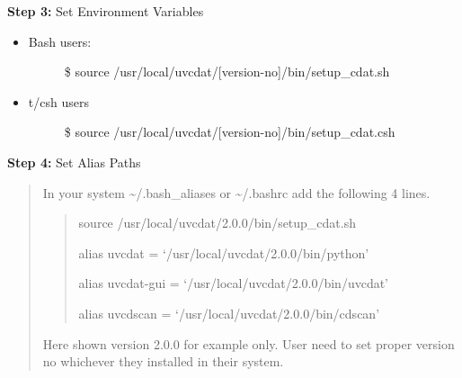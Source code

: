 \documentclass[letterpaper,10pt,english]{sphinxmanual}
\begin{document}
\textbf{Step 3:} Set Environment Variables
\begin{itemize}
\item {} \begin{description}
\item[{Bash users:}] \leavevmode
\$ source /usr/local/uvcdat/{[}version-no{]}/bin/setup\_cdat.sh

\end{description}

\item {} \begin{description}
\item[{t/csh users}] \leavevmode
\$ source /usr/local/uvcdat/{[}version-no{]}/bin/setup\_cdat.csh

\end{description}

\end{itemize}

\textbf{Step 4:} Set Alias Paths
\begin{quote}

In your system \textasciitilde{}/.bash\_aliases or \textasciitilde{}/.bashrc  add the following 4 lines.
\begin{quote}

source /usr/local/uvcdat/2.0.0/bin/setup\_cdat.sh

alias  uvcdat = `/usr/local/uvcdat/2.0.0/bin/python'

alias  uvcdat-gui = `/usr/local/uvcdat/2.0.0/bin/uvcdat'

alias  uvcdscan = `/usr/local/uvcdat/2.0.0/bin/cdscan'
\end{quote}

Here shown version 2.0.0 for example only. User need to set proper version no whichever they installed in their system.
\end{quote}
\end{document}
